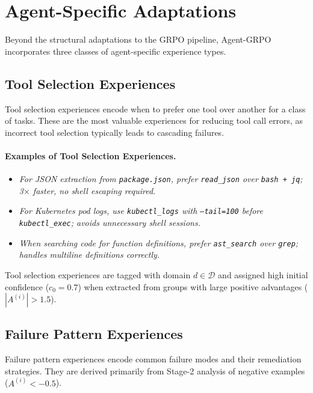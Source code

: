 \section{Agent-Specific Adaptations}

\label{sec:adaptations}

Beyond the structural adaptations to the GRPO pipeline, Agent-GRPO incorporates
three classes of agent-specific experience types.

\subsection{Tool Selection Experiences}

Tool selection experiences encode when to prefer one tool over another for
a class of tasks. These are the most valuable experiences for reducing tool
call errors, as incorrect tool selection typically leads to cascading failures.

\paragraph{Examples of Tool Selection Experiences.}
\begin{itemize}[leftmargin=1.5em]
    \item \textit{For JSON extraction from \texttt{package.json}, prefer
          \texttt{read\_json} over \texttt{bash\,+\,jq}; 3$\times$ faster,
          no shell escaping required.}
    \item \textit{For Kubernetes pod logs, use \texttt{kubectl\_logs}
          with \texttt{--tail=100} before \texttt{kubectl\_exec}; avoids
          unnecessary shell sessions.}
    \item \textit{When searching code for function definitions, prefer
          \texttt{ast\_search} over \texttt{grep}; handles multiline
          definitions correctly.}
\end{itemize}

Tool selection experiences are tagged with domain $d \in \mathcal{D}$ and
assigned high initial confidence ($c_0 = 0.7$) when extracted from groups with
large positive advantages ($|A^{(i)}| > 1.5$).

\subsection{Failure Pattern Experiences}

Failure pattern experiences encode common failure modes and their remediation
strategies. They are derived primarily from Stage-2 analysis of negative
examples ($A^{(i)} < -0.5$).


